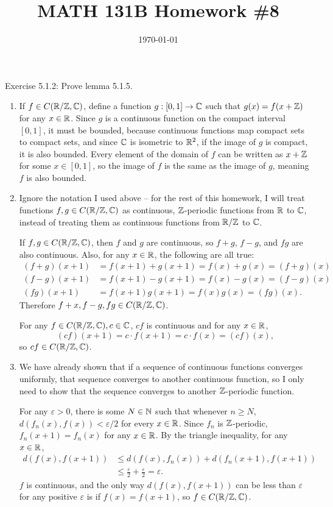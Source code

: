 \documentclass{article}
\date{\today}
\title{MATH 131B Homework \#8}
\begin{document}
\maketitle

\begin{prob}
    Exercise 5.1.2: Prove lemma 5.1.5.
\end{prob}
\begin{enumerate}[label=(\alph*)]
    \item If $f \in C(\mathbb{R}/\mathbb{Z}, \mathbb{C})$, define a function $g: [0, 1] \rightarrow \mathbb{C}$ such that $g(x) = f(x + \mathbb{Z})$ for any $x \in \mathbb{R}$. Since $g$ is a continuous function on the compact interval $[0,1]$, it must be bounded, because continuous functions map compact sets to compact sets, and since $\mathbb{C}$ is isometric to $\mathbb{R}^2$, if the image of $g$ is compact, it is also bounded. Every element of the domain of $f$ can be written as $x + \mathbb{Z}$ for some $x \in [0, 1]$, so the image of $f$ is the same as the image of $g$, meaning $f$ is also bounded.
    \item Ignore the notation I used above -- for the rest of this homework, I will treat functions $f,g \in C(\mathbb{R}/\mathbb{Z}, \mathbb{C})$ as continuous, $\mathbb{Z}$-periodic functions from $\mathbb{R}$ to $\mathbb{C}$, instead of treating them as continuous functions from $\mathbb{R}/\mathbb{Z}$ to $\mathbb{C}$.
        \par
        If $f,g \in C(\mathbb{R}/\mathbb{Z}, \mathbb{C})$, then $f$ and $g$ are continuous, so $f+g$, $f-g$, and $fg$ are also continuous. Also, for any $x \in \mathbb{R}$, the following are all true:
        \begin{align*}
            (f+g)(x+1) &= f(x+1)+g(x+1)=f(x)+g(x)=(f+g)(x) \\
            (f-g)(x+1) &= f(x+1)-g(x+1)=f(x)-g(x)=(f-g)(x) \\
            (fg)(x+1) &= f(x+1)g(x+1)=f(x)g(x)=(fg)(x).
        \end{align*}
        Therefore $f+x,f-g,fg \in C(\mathbb{R}/\mathbb{Z}, \mathbb{C})$.
        \par
        For any $f \in C(\mathbb{R}/\mathbb{Z},\mathbb{C}), c \in \mathbb{C}$, $cf$ is continuous and for any $x \in \mathbb{R}$,
        \[ (cf)(x+1)=c \cdot f(x+1) = c \cdot f(x) = (cf)(x), \]
        so $cf \in C(\mathbb{R}/\mathbb{Z}, \mathbb{C})$.
    \item We have already shown that if a sequence of continuous functions converges uniformly, that sequence converges to another continuous function, so I only need to show that the sequence converges to another $\mathbb{Z}$-periodic function.
        \par
        For any $\varepsilon > 0$, there is some $N \in \mathbb{N}$ such that whenever $n \geq N$, $d(f_n(x), f(x)) < \varepsilon / 2$ for every $x \in \mathbb{R}$. Since $f_n$ is $\mathbb{Z}$-periodic, $f_n(x+1)=f_n(x)$ for any $x \in \mathbb{R}$. By the triangle inequality, for any $x \in \mathbb{R}$,
        \begin{align*}
            d(f(x), f(x+1)) &\leq d(f(x), f_n(x)) + d(f_n(x+1), f(x+1)) \\
                            &\leq \frac{\varepsilon}{2} + \frac{\varepsilon}{2} = \varepsilon.
        \end{align*}
        $f$ is continuous, and the only way $d(f(x),f(x+1))$ can be less than $\varepsilon$ for any positive $\varepsilon$ is if $f(x)=f(x+1)$, so $f \in C(\mathbb{R}/\mathbb{Z}, \mathbb{C})$.
\end{enumerate}
\end{document}
